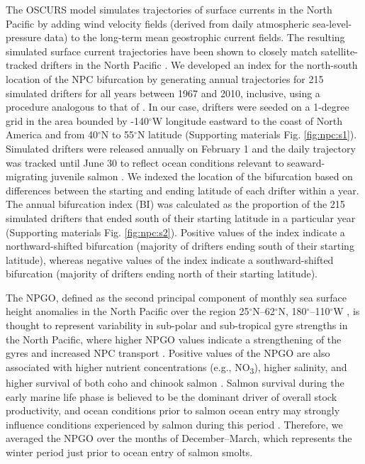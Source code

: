 The OSCURS model simulates trajectories of surface currents in the North Pacific
by adding wind velocity fields (derived from daily atmospheric
sea-level-pressure data) to the long-term mean geostrophic current fields. The
resulting simulated surface current trajectories have been shown to closely
match satellite-tracked drifters in the North Pacific \citep{Ingraham1997a}. We
developed an index for the north-south location of the NPC bifurcation by
generating annual trajectories for 215 simulated drifters for all years between
1967 and 2010, inclusive, using a procedure analogous to that of
\citet{Watters2008a}. In our case, drifters were seeded on a 1-degree grid in
the area bounded by -140$^{\circ}$W longitude eastward to the coast of North
America and from 40$^{\circ}$N to 55$^{\circ}$N latitude (Supporting materials
Fig. \ref{fig:npc:s1}). Simulated drifters were released annually on February 1
and the daily trajectory was tracked until June 30 to reflect ocean conditions
relevant to seaward-migrating juvenile salmon \citep{DiLorenzo2013a}. We indexed
the location of the bifurcation based on differences between the starting and
ending latitude of each drifter within a year. The annual bifurcation index (BI)
was calculated as the proportion of the 215 simulated drifters that ended south
of their starting latitude in a particular year (Supporting materials Fig.
\ref{fig:npc:s2}). Positive values of the index indicate a northward-shifted
bifurcation (majority of drifters ending south of their starting latitude),
whereas negative values of the index indicate a southward-shifted bifurcation
(majority of drifters ending north of their starting latitude).

The NPGO, defined as the second principal component of monthly sea surface
height anomalies in the North Pacific over the region
25$^{\circ}$N--62$^{\circ}$N, 180$^{\circ}$--110$^{\circ}$W
\citep{Di-Lorenzo2008a}, is thought to represent variability in sub-polar and
sub-tropical gyre strengths in the North Pacific, where higher NPGO values
indicate a strengthening of the gyres and increased NPC transport
\citep{Chhak2009a, Di-Lorenzo2009a, Di-Lorenzo2008a}. Positive values of the
NPGO are also associated with higher nutrient concentrations (e.g.,
NO\textsubscript{3}), higher salinity, and higher survival of both coho and
chinook salmon \citep{Di-Lorenzo2008a, Di-Lorenzo2009a, Kilduff2015}. Salmon
survival during the early marine life phase is believed to be the dominant
driver of overall stock productivity, and ocean conditions prior to salmon ocean
entry may strongly influence conditions experienced by salmon during this period
\citep{Parker1968a, Wertheimer2007a, Yeh2011, DiLorenzo2013a}. Therefore, we
averaged the NPGO over the months of December--March, which represents the
winter period just prior to ocean entry of salmon smolts.

